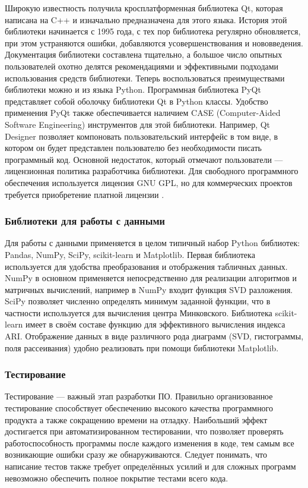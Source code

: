 \documentclass[12pt]{diploma}
\begin{document}
	Широкую известность получила кросплатформенная библиотека Qt, которая написана на C++ и изначально предназначена для этого языка. История этой библиотеки начинается с 1995 года, с тех пор библиотека регулярно обновляется, при этом устраняются ошибки, добавляются усовершенствования и нововведения. Документация библиотеки составлена тщательно, а большое число опытных пользователей охотно делятся рекомендациями и эффективными подходами использования средств библиотеки. Теперь воспользоваться преимуществами библиотеки можно и из языка Python. Программная библиотека PyQt представляет собой оболочку библиотеки Qt в Python классы. Удобство применения PyQt также обеспечивается наличием CASE (Computer-Aided Software Engineering) инструментов для этой библиотеки. Например, Qt Designer позволяет компоновать пользовательский интерфейс в том виде, в котором он будет представлен пользователю без необходимости писать программный код. Основной недостаток, который отмечают пользователи --- лицензионная политика разработчика библиотеки. Для свободного программного обеспечения используется лицензия GNU GPL, но для коммерческих проектов требуется приобретение платной лицензии \cite{PyQt}.
		
		
	\subsubsection{Библиотеки для работы с данными}	
	Для работы с данными применяется в целом типичный набор Python библиотек: Pandas, NumPy, SciPy, scikit-learn и Matplotlib. Первая библиотека используется для удобства преобразования и отображения табличных данных. NumPy в основном применяется непосредственно для реализации алгоритмов и матричных вычислений, например в NumPy входит функция SVD разложения. SciPy позволяет численно определять минимум заданной функции, что в частности используется для вычисления центра Минковского. Библиотека scikit-learn имеет в своём составе функцию для эффективного вычисления индекса ARI. Отображение данных в виде различного рода диаграмм (SVD, гистограммы, поля рассеивания) удобно реализовать при помощи библиотеки Matplotlib.
	
	\subsubsection{Тестирование}
	Тестирование --- важный этап разработки ПО. Правильно организованное тестирование способствует обеспечению высокого качества программного продукта а также сокращению времени на отладку. Наибольший эффект достигается при автоматизированном тестировании, что позволяет проверять работоспособность программы после каждого изменения в коде, тем самым все возникающие ошибки сразу же обнаруживаются. Следует понимать, что написание тестов также требует определённых усилий и для сложных программ невозможно обеспечить полное покрытие тестами всего кода. 
	
\end{document}
